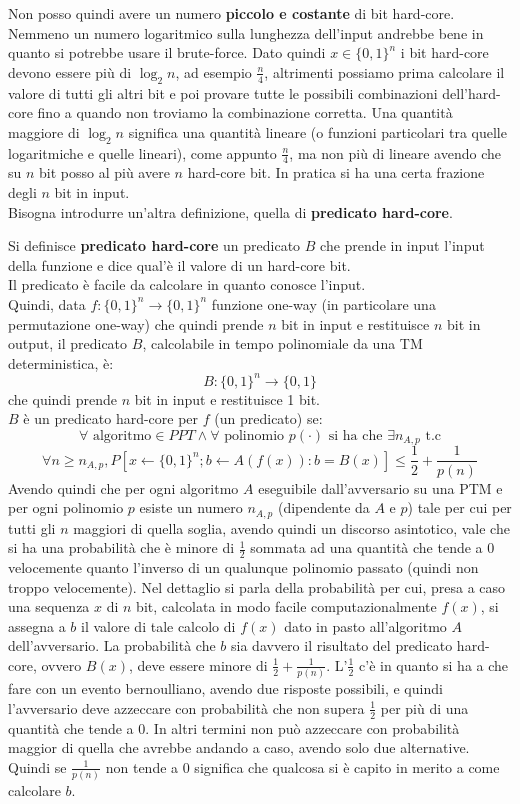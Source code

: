 \documentclass[a4paper,12pt, oneside]{book}
\begin{document}
Non posso quindi avere un numero \textbf{piccolo e costante} di bit hard-core.\\
Nemmeno un numero logaritmico sulla lunghezza dell'input andrebbe bene in
quanto si potrebbe usare il brute-force. Dato quindi $x\in\{0,1\}^n$ i bit
hard-core devono essere più di $\log_2n$, ad esempio $\frac{n}{4}$, altrimenti
possiamo prima calcolare il valore di tutti gli altri bit e poi provare tutte le
possibili combinazioni dell'hard-core fino a quando non troviamo la combinazione
corretta. Una quantità maggiore di $\log_2n$ significa una quantità lineare (o
funzioni particolari tra quelle logaritmiche e quelle lineari), come appunto
$\frac{n}{4}$, ma non più di 
lineare avendo che su $n$ bit posso al più avere $n$ hard-core bit. In pratica
si ha una certa frazione degli $n$ bit in input.\\
Bisogna introdurre un'altra definizione, quella di \textbf{predicato hard-core}.
\begin{definizione}
  Si definisce \textbf{predicato hard-core} un predicato $B$ che prende in input
  l'input della funzione e dice qual'è il valore di un hard-core bit.\\
  Il predicato è facile da calcolare in quanto conosce l'input.\\
  Quindi, data $f:\{0,1\}^n\to\{0,1\}^n$ funzione one-way (in particolare una
  permutazione one-way) che
  quindi prende $n$ bit in input e restituisce $n$ bit in output, il
  predicato $B$, calcolabile in tempo polinomiale da una TM deterministica, è: 
  \[B:\{0,1\}^n\to\{0,1\}\]
  che quindi prende $n$ bit in input e restituisce 1 bit.\\
  $B$ è un predicato hard-core per $f$ (un predicato) se:
  \[\forall \mbox{ algoritmo}\in PPT\land\forall\mbox{ polinomio }p(\cdot)
    \mbox{ si ha che }\exists n_{A,p} \mbox{ t.c}\]
  \[\forall n\geq n_{A,p},P[x\gets \{0,1\}^n ; b \gets A( f ( x)) : b = B(
    x)]\leq\frac{1}{2}+\frac{1}{p(n)}\] 
  Avendo quindi che per ogni algoritmo $A$ eseguibile dall'avversario su una PTM
  e per ogni polinomio $p$ esiste un numero $n_{A,p}$ (dipendente da $A$ e $p$)
  tale per cui per tutti gli $n$ maggiori di quella soglia, avendo quindi un
  discorso asintotico, vale che si ha una probabilità che è minore di
  $\frac{1}{2}$ sommata ad una quantità che tende a 0 velocemente quanto
  l'inverso di un qualunque polinomio passato (quindi non troppo
  velocemente). Nel dettaglio si parla della probabilità per cui, presa a caso
  una sequenza $x$ di $n$ bit, calcolata in modo facile computazionalmente
  $f(x)$, si assegna a $b$ il valore di tale calcolo di $f(x)$ dato in pasto
  all'algoritmo $A$ dell'avversario. La probabilità che $b$ sia davvero il
  risultato del predicato hard-core, ovvero $B(x)$, deve essere minore di
  $\frac{1}{2}+\frac{1}{p(n)}$. L'$\frac{1}{2}$ c'è in quanto si ha a che fare
  con un evento bernoulliano, avendo due risposte possibili, e quindi
  l'avversario deve azzeccare con probabilità che non supera $\frac{1}{2}$ per
  più di una quantità che tende a 0. In altri termini non può azzeccare con
  probabilità maggior di quella che avrebbe andando a caso, avendo solo due
  alternative. Quindi se $\frac{1}{p(n)}$ non tende a 0 significa che qualcosa
  si è capito in merito a come calcolare $b$. 
\end{definizione}
\end{document}
